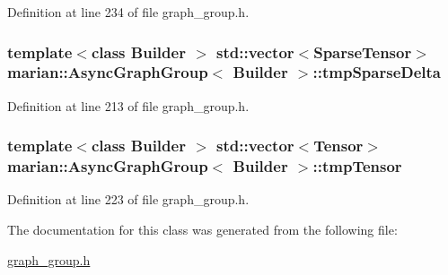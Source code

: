 Definition at line 234 of file graph\+\_\+group.\+h.

\subsubsection[{\texorpdfstring{tmp\+Sparse\+Delta}{tmpSparseDelta}}]{\setlength{\rightskip}{0pt plus 5cm}template$<$class Builder $>$ std\+::vector$<${\bf Sparse\+Tensor}$>$ {\bf marian\+::\+Async\+Graph\+Group}$<$ Builder $>$\+::tmp\+Sparse\+Delta\hspace{0.3cm}{\ttfamily [private]}}\hypertarget{classmarian_1_1AsyncGraphGroup_aac1e70623a858adb914f6ed6a491c3a8}{}\label{classmarian_1_1AsyncGraphGroup_aac1e70623a858adb914f6ed6a491c3a8}


Definition at line 213 of file graph\+\_\+group.\+h.

\subsubsection[{\texorpdfstring{tmp\+Tensor}{tmpTensor}}]{\setlength{\rightskip}{0pt plus 5cm}template$<$class Builder $>$ std\+::vector$<${\bf Tensor}$>$ {\bf marian\+::\+Async\+Graph\+Group}$<$ Builder $>$\+::tmp\+Tensor\hspace{0.3cm}{\ttfamily [private]}}\hypertarget{classmarian_1_1AsyncGraphGroup_a5ae977ce219101bcf4166f123bbb8216}{}\label{classmarian_1_1AsyncGraphGroup_a5ae977ce219101bcf4166f123bbb8216}


Definition at line 223 of file graph\+\_\+group.\+h.



The documentation for this class was generated from the following file\+:\begin{DoxyCompactItemize}
\item 
\hyperlink{graph__group_8h}{graph\+\_\+group.\+h}\end{DoxyCompactItemize}
